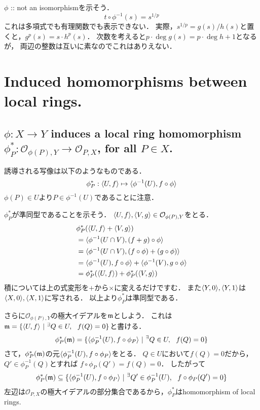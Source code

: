 \documentclass[a4paper]{jsarticle}
\begin{document}
    $\phi$ :: not an isomorphismを示そう．
    \[ t \circ \phi^{-1}(s)=s^{1/p} \]
    これは多項式でも有理関数でも表示できない．
    実際，$s^{1/p}=g(s)/h(s)$と置くと，$g^p(s)=s \cdot h^p(s)$．
    次数を考えると$p \cdot \deg g(s)=p \cdot \deg h+1$となるが，
    両辺の整数は互いに素なのでこれはありえない．

\section{Induced homomorphisms between local rings.} %
    \subsection{$\phi: X \to Y$ induces a local ring homomorphism $\phi_P^{\ast}: \mathcal{O}_{\phi(P), Y} \to \mathcal{O}_{P, X}$, for all $P \in X$.}
    誘導される写像は以下のようなものである．
    \[ \phi_P^{\ast}: \langle U,f \rangle \mapsto \langle \phi^{-1}(U),f \circ \phi \rangle \]
    $\phi(P) \in U$より$P \in \phi^{-1}(U)$であることに注意．

    $\phi_P^{\ast}$が準同型であることを示そう．
    $\langle U,f \rangle, \langle V,g \rangle \in \mathcal{O}_{\phi(P), Y}$をとる．
    \begin{align*}
        {}& \phi_P^{\ast}(\langle U,f \rangle+\langle V,g \rangle) \\
        &   =\langle \phi^{-1}(U \cap V),(f+g) \circ \phi \rangle \\
        &   =\langle \phi^{-1}(U \cap V),(f \circ \phi)+(g \circ \phi) \rangle \\
        &   =\langle \phi^{-1}(U),f \circ \phi \rangle+\langle \phi^{-1}(V),g \circ \phi \rangle \\
        &   =\phi_P^{\ast}(\langle U,f \rangle)+\phi_P^{\ast}(\langle V,g \rangle)
    \end{align*}
    積については上の式変形を$+$から$\times$に変えるだけですむ．
    また$\langle Y,0 \rangle, \langle Y,1 \rangle$は$\langle X,0 \rangle, \langle X,1 \rangle$に写される．
    以上より$\phi_P^{\ast}$は準同型である．

    さらに$\mathcal{O}_{\phi(P), Y}$の極大イデアルを$\mathfrak{m}$としよう．
    これは$\mathfrak{m}=\{ \langle U,f \rangle ~|~ {}^{\exists} Q \in U,~~ f(Q)=0 \}$と書ける．
    \[ \phi_P^{\ast}(\mathfrak{m})=\{ \langle \phi_P^{-1}(U),f \circ \phi_P \rangle ~|~ {}^{\exists} Q \in U,~~ f(Q)=0 \} \]
    さて，$\phi_P^{\ast}(\mathfrak{m})$の元$\langle \phi_P^{-1}(U),f \circ \phi_P \rangle$をとる．
    $Q \in U$において$f(Q)=0$だから，$Q' \in \phi_P^{-1}(Q)$とすれば
    $f \circ \phi_P(Q')=f(Q)=0$．
    したがって
    \[ \phi_P^{\ast}(\mathfrak{m}) \subseteq \{ \langle \phi_P^{-1}(U),f \circ \phi_P \rangle ~|~ {}^{\exists} Q' \in \phi_P^{-1}(U),~~ f \circ \phi_P(Q')=0 \} \]
    左辺は$\mathcal{O}_{P, X}$の極大イデアルの部分集合であるから，$\phi_P^{\ast}$はhomomorphism of local rings.
\end{document}
